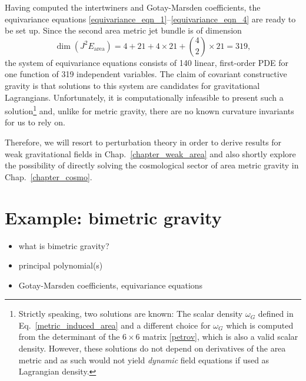 Having computed the intertwiners and Gotay-Marsden coefficients, the equivariance equations \eqref{equivariance_eqn_1}--\eqref{equivariance_eqn_4} are ready to be set up. Since the second area metric jet bundle is of dimension
\begin{equation}
  \operatorname{dim}(J^2E_\text{area}) = 4 + 21 + 4\times 21 + \binom{4}{2}\times 21 = 319,
\end{equation}
the system of equivariance equations consists of 140 linear, first-order PDE for one function of 319 independent variables. The claim of covariant constructive gravity is that solutions to this system are candidates for gravitational Lagrangians. Unfortunately, it is computationally infeasible to present such a solution\footnote{Strictly speaking, two solutions are known: The scalar density $\omega_G$ defined in Eq.~\ref{metric_induced_area} and a different choice for $\omega_G$ which is computed from the determinant of the $6\times 6$ matrix \eqref{petrov}, which is also a valid scalar density. However, these solutions do not depend on derivatives of the area metric and as such would not yield \emph{dynamic} field equations if used as Lagrangian density.} and, unlike for metric gravity, there are no known curvature invariants for us to rely on.

Therefore, we will resort to perturbation theory in order to derive results for weak gravitational fields in Chap.~\ref{chapter_weak_area} and also shortly explore the possibility of directly solving the cosmological sector of area metric gravity in Chap.~\ref{chapter_cosmo}.

\section{Example: bimetric gravity}
\begin{itemize}
\item what is bimetric gravity?
\item principal polynomial(s)
\item Gotay-Marsden coefficients, equivariance equations
\end{itemize}


